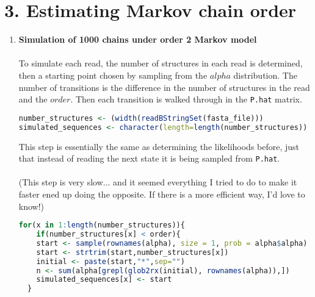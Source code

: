 \documentclass[12pt]{article}
\begin{document}
\section*{3. Estimating Markov chain order}
\begin{enumerate}[label = \textbf{\alph*.}]
  \item \textbf{Simulation of 1000 chains under order 2 Markov model}\\\\
    To simulate each read, the number of structures in each read is determined, then a starting point chosen by sampling from the $alpha$ distribution. The number of transitions is the difference in the number of structures in the read and the $order$. Then each transition is walked through in the \texttt{P.hat} matrix.
    \begin{lstlisting}[language=R]
number_structures <- (width(readBStringSet(fasta_file)))
simulated_sequences <- character(length=length(number_structures))
    \end{lstlisting}
    This step is essentially the same as determining the likelihoods before, just that instead of reading the next state it is being sampled from \texttt{P.hat}. \\\\
    (This step is very slow... and it seemed everything I tried to do to make it faster ened up doing the opposite. If there is a more efficient way, I'd love to know!)
    \begin{lstlisting}[language=R]
for(x in 1:length(number_structures)){
    if(number_structures[x] < order){
    start <- sample(rownames(alpha), size = 1, prob = alpha$alpha)
    start <- strtrim(start,number_structures[x])
    initial <- paste(start,"*",sep="")
    n <- sum(alpha[grepl(glob2rx(initial), rownames(alpha)),])
    simulated_sequences[x] <- start
  }


\end{lstlisting}
\end{enumerate}
\end{document}
